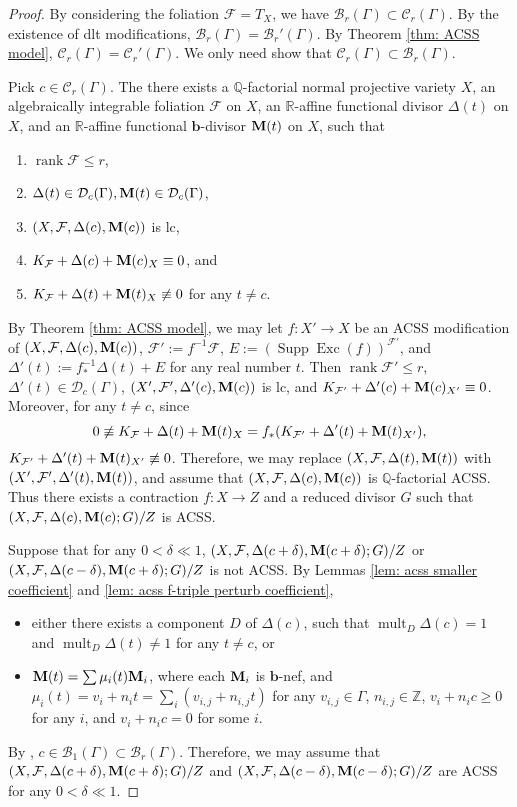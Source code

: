 \documentclass[11pt]{amsart}
\numberwithin{equation}{section}
\newcommand{\bb}{\bm{b}}
\newcommand{\Mm}{{\bf{M}}}
\newcommand{\Qq}{\mathbb{Q}}
\newcommand{\Rr}{\mathbb{R}}
\newcommand{\Exc}{\operatorname{Exc}}
\newcommand{\rk}{\operatorname{rank}}
\newcommand{\Supp}{\operatorname{Supp}}
\newcommand{\mult}{\operatorname{mult}}
\newcommand{\Ff}{\mathcal{F}}
\newcommand{\Ii}{\Gamma}
\theoremstyle{definition}
\theoremstyle{definition}
\theoremstyle{definition}
\begin{document}
\begin{proof}
By considering the foliation $\Ff=T_X$, we have $\mathcal{B}_r(\Ii)\subset\mathcal{C}_r(\Ii)$. By the existence of dlt modifications, $\mathcal{B}_r(\Ii)=\mathcal{B}_r'(\Ii)$. By Theorem \ref{thm:  ACSS model}, $\mathcal{C}_r(\Ii)=\mathcal{C}_r'(\Ii)$. We only need show that $\mathcal{C}_r(\Ii)\subset\mathcal{B}_r(\Ii)$.

Pick $c\in\mathcal{C}_r(\Ii)$. The there exists a $\Qq$-factorial normal projective variety $X$, an algebraically integrable foliation $\Ff$ on $X$, an $\Rr$-affine functional divisor $\Delta(t)$ on $X$, and an $\Rr$-affine functional $\bb$-divisor $\Mm(t)$ on $X$, such that
\begin{enumerate}
	\item $\rk\Ff\le r$, 
	\item $\Delta(t)\in\mathcal{D}_{c}(\Ii),\Mm(t)\in\mathcal{D}_c(\Ii)$,
	\item $(X,\Ff,\Delta(c),\Mm(c))$ is lc,
	\item $K_{\Ff}+\Delta(c)+\Mm(c)_X\equiv0$, and
	\item $K_{\Ff}+\Delta(t)+\Mm(t)_X\not\equiv 0$ for any $t\not=c$.
\end{enumerate}
By Theorem \ref{thm:  ACSS model}, we may let $f: X'\rightarrow X$ be an ACSS modification of $(X,\Ff,\Delta(c),\Mm(c))$, $\Ff':=f^{-1}\Ff$, $E:=(\Supp\Exc(f))^{\Ff'}$, and $\Delta'(t):=f^{-1}_*\Delta(t)+E$ for any real number $t$. Then $\rk\Ff'\leq r$, $\Delta'(t)\in\mathcal{D}_c(\Ii)$, $(X',\Ff',\Delta'(c),\Mm(c))$ is lc, and $K_{\Ff'}+\Delta'(c)+\Mm(c)_{X'}\equiv 0$. Moreover, for any $t\not=c$, since $$0\not\equiv K_{\Ff}+\Delta(t)+\Mm(t)_X=f_*(K_{\Ff'}+\Delta'(t)+\Mm(t)_{X'}),$$ $K_{\Ff'}+\Delta'(t)+\Mm(t)_{X'}\not\equiv 0$. Therefore, we may replace $(X,\Ff,\Delta(t),\Mm(t))$ with $(X',\Ff',\Delta'(t),\Mm(t))$, and assume that $(X,\Ff,\Delta(c),\Mm(c))$ is $\Qq$-factorial ACSS. Thus there exists a contraction $f: X\rightarrow Z$ and a reduced divisor $G$ such that $(X,\Ff,\Delta(c),\Mm(c);G)/Z$ is ACSS.

Suppose that for any $0<\delta\ll 1$, $(X,\Ff,\Delta(c+\delta),\Mm(c+\delta);G)/Z$ or $(X,\Ff,\Delta(c-\delta),\Mm(c+\delta);G)/Z$ is not ACSS. By Lemmas \ref{lem: acss smaller coefficient} and \ref{lem: acss f-triple perturb coefficient},
\begin{itemize}
    \item either there exists a component $D$ of $\Delta(c)$, such that $\mult_D\Delta(c)=1$ and $\mult_D\Delta(t)\not=1$ for any $t\not=c$, or
    \item $\Mm(t)=\sum \mu_i(t)\Mm_i$, where each $\Mm_i$ is $\bb$-nef, and $\mu_i(t)=v_{i}+n_{i}t=\sum_i(v_{i,j}+n_{i,j}t)$ for any $v_{i,j}\in\Ii$, $n_{i,j}\in\mathbb Z$, $v_{i}+n_{i}c\geq 0$ for any $i$, and $v_i+n_ic=0$ for some $i$.
\end{itemize}
 By \cite[Lemma 3.7]{Nak16}, $c\in\mathcal{B}_1(\Ii)\subset\mathcal{B}_r(\Ii)$. Therefore, we may assume that $(X,\Ff,\Delta(c+\delta),\Mm(c+\delta);G)/Z$ and $(X,\Ff,\Delta(c-\delta),\Mm(c-\delta);G)/Z$ are ACSS for any $0<\delta\ll 1$. 


\end{proof}
\end{document}
